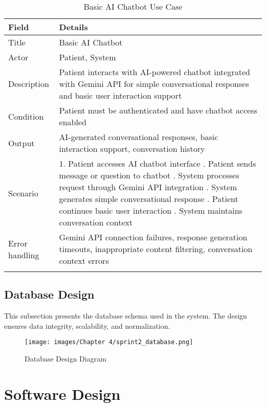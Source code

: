 \begin{longtable}{|p{3cm}|p{12cm}|}
\hline
\textbf{Field} & \textbf{Details} \\
\hline
Title & Basic AI Chatbot \\
\hline
Actor & Patient, System \\
\hline
Description & Patient interacts with AI-powered chatbot integrated with Gemini API for simple conversational responses and basic user interaction support \\
\hline
Condition & Patient must be authenticated and have chatbot access enabled \\
\hline
Output & AI-generated conversational responses, basic interaction support, conversation history \\
\hline
Scenario & 1. Patient accesses AI chatbot interface \newline 2. Patient sends message or question to chatbot \newline 3. System processes request through Gemini API integration \newline 4. System generates simple conversational response \newline 5. Patient continues basic user interaction \newline 6. System maintains conversation context \\
\hline
Error handling & Gemini API connection failures, response generation timeouts, inappropriate content filtering, conversation context errors \\
\hline
\caption{Basic AI Chatbot Use Case}
\end{longtable}


\subsection{Database Design}

This subsection presents the database schema used in the system. The design ensures data integrity, scalability, and normalization.

\begin{figure}[H]
    \centering
    \texttt{[image: images/Chapter 4/sprint2\_database.png]}
    \caption{Database Design Diagram}
    \label{fig:database-design}
\end{figure}

\section{Software Design}

